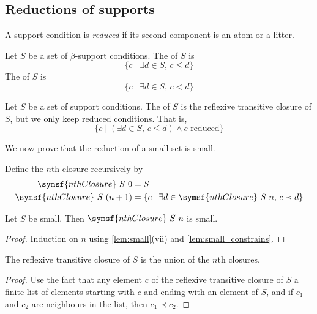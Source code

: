 \subsection{Reductions of supports}

\begin{definition}
    A support condition is \emph{reduced} if its second component is an atom or a litter.
\end{definition}
\begin{definition}
    Let \( S \) be a set of \( \beta \)-support conditions.
    The  of \( S \) is
    \[ \{c \mid \exists d \in S,\, c \leq d\} \]
    The  of \( S \) is
    \[ \{c \mid \exists d \in S,\, c < d\} \]
\end{definition}
\begin{definition}
    Let \( S \) be a set of support conditions.
    The  of \( S \) is the reflexive transitive closure of \( S \), but we only keep reduced conditions.
    That is,
    \[ \{c \mid (\exists d \in S,\, c \leq d) \wedge c \text{ reduced}\} \]
\end{definition}
We now prove that the reduction of a small set is small.
\begin{definition}
    Define the \( n \)th closure recursively by
    \begin{align*}
        \symsf{nthClosure}\ S\ 0 &= S \\
        \symsf{nthClosure}\ S\ (n + 1) &= \{ c \mid \exists d \in \symsf{nthClosure}\ S\ n,\, c \prec d \}
    \end{align*}
\end{definition}
\begin{lemma}
    \label{lem:nthClosure_small}
    Let \( S \) be small.
    Then \( \symsf{nthClosure}\ S\ n \) is small.
\end{lemma}
\begin{proof}
    Induction on \( n \) using \cref{lem:small}(vii) and \cref{lem:small_constrains}.
\end{proof}
\begin{lemma}
    \label{lem:reflTransClosure_eq_iUnion_nthClosure}
    The reflexive transitive closure of \( S \) is the union of the \( n \)th closures.
\end{lemma}
\begin{proof}
    Use the fact that any element \( c \) of the reflexive transitive closure of \( S \)  a finite list of elements starting with \( c \) and ending with an element of \( S \), and if \( c_1 \) and \( c_2 \) are neighbours in the list, then \( c_1 \prec c_2 \).
\end{proof}
